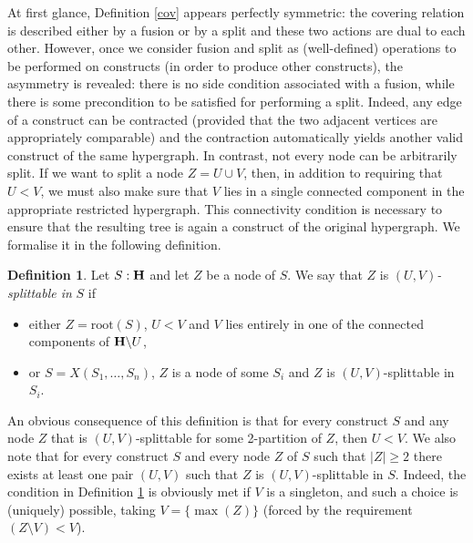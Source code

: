 \documentclass{article}
\theoremstyle{plain}
\theoremstyle{definition}
\newtheorem{definition}[thm]{Definition}
\newcommand{\set}[1]{\{#1\}}
\newcommand{\hyper}[1]{{\bf #1}}
\begin{document}
At first glance, Definition \ref{cov} appears perfectly symmetric: the covering relation is described either by a fusion or by a split and these two actions are dual to each other. However, once we consider fusion and split as (well-defined) operations to be performed on constructs (in order to produce other constructs), the asymmetry is revealed: there is no side condition associated with a fusion, while there is some precondition to be satisfied for performing a split. Indeed, any edge of a construct can be contracted (provided that the two adjacent vertices are appropriately comparable) and the contraction automatically yields another valid construct of the same hypergraph. In contrast, not every node can be arbitrarily split. If we want to split a node $Z=U\cup V$, then, in addition to requiring that $U<V$, we must also make sure that $V$ lies in a single connected component in the appropriate restricted hypergraph. This connectivity condition is necessary to ensure that the resulting tree is again a construct of the original hypergraph. We formalise it in the following definition. 
\begin{definition} \label{splittable-definition}
Let $S:\hyper{H}$ and let $Z$ be a node of $S$. We say that $Z$ is {\em $(U,V)$-splittable in} $S$ if
\begin{itemize}
\item either $Z=\text{root}(S)$, $U<V$ and $V$ lies entirely in one of the connected components of $\hyper{H}{\setminus U}$,
\item or $S=X(S_1,\ldots,S_n)$, $Z$ is a node of some $S_i$ and $Z$ is $(U,V)$-splittable in $S_i$.
\end{itemize}
\end{definition}
An obvious consequence of this definition is that for every construct $S$ and any node $Z$ that is 
$(U,V)$-splittable for some 2-partition of $Z$, then $U<V$.
We also note that for every construct $S$ and every node $Z$ of $S$ such that $|Z|\geq 2$ there exists at least one pair $(U,V)$ such that $Z$ is $(U,V)$-splittable in $S$. Indeed, the condition in Definition
\ref{splittable-definition} is obviously met if $V$ is a singleton, and such a choice is (uniquely) possible, taking $V=\set{\max(Z)}$ (forced by the requirement $(Z\setminus V)<V$).

\smallskip
\end{document}

